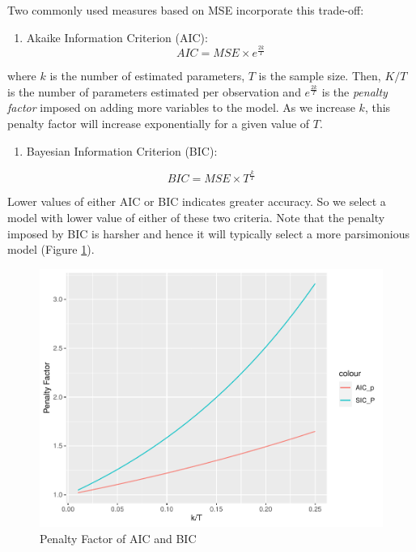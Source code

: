 \documentclass[]{book}
\providecommand{\tightlist}{%
  \setlength{\itemsep}{0pt}\setlength{\parskip}{0pt}}
\theoremstyle{definition}
\theoremstyle{definition}
\theoremstyle{definition}
\theoremstyle{remark}
\begin{document}
Two commonly used measures based on MSE incorporate this trade-off:

\begin{enumerate}
\def\labelenumi{\arabic{enumi}.}
\tightlist
\item
  Akaike Information Criterion (AIC):
  \[ AIC= MSE \times e^{\frac{2k}{T}} \]
\end{enumerate}

where \(k\) is the number of estimated parameters, \(T\) is the sample size. Then, \(K/T\) is the number of parameters estimated per observation and \(e^{\frac{2k}{T}}\) is the \emph{penalty factor} imposed on adding more variables to the model. As we increase \(k\), this penalty factor will increase exponentially for a given value of \(T\).

\begin{enumerate}
\def\labelenumi{\arabic{enumi}.}
\setcounter{enumi}{1}
\tightlist
\item
  Bayesian Information Criterion (BIC):
\end{enumerate}

\[ BIC= MSE \times T^{\frac{k}{T}} \]

Lower values of either AIC or BIC indicates greater accuracy. So we select a model with lower value of either of these two criteria. Note that the penalty imposed by BIC is harsher and hence it will typically select a more parsimonious model (Figure \ref{fig:ch2-figure1}).

\begin{figure}

{\centering \includegraphics[width=0.8\linewidth]{bookdown-demo_files/figure-latex/ch2-figure1-1} 

}

\caption{Penalty Factor of AIC and BIC}\label{fig:ch2-figure1}
\end{figure}
\end{document}
